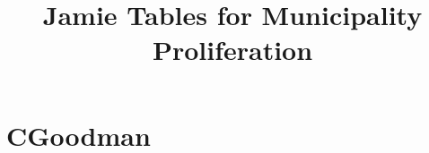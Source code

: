 \documentclass{article}
\title{Jamie Tables for Municipality Proliferation}
\begin{document}
\maketitle
\tableofcontents
{\footnotesize 
\listoffigures
\listoftables}
\clearpage

\section{CGoodman}
\begin{table}




\end{table}
\end{document}
